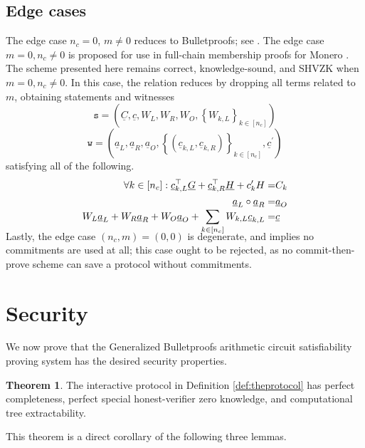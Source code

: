 \documentclass{article}
\theoremstyle{definition}
\newtheorem{theorem}{Theorem}
\begin{document}
\subsection{Edge cases}

The edge case $n_c = 0$, $m \neq 0$ reduces to Bulletproofs; see \cite{bp}.  The edge case $m = 0, n_c \neq 0$ is proposed for use in full-chain membership proofs for Monero \cite{fcmp}. 
The scheme presented here remains correct, knowledge-sound, and SHVZK when $m=0, n_c \neq 0$. In this case, the relation reduces by dropping all terms related to $m$, obtaining statements and witnesses
\[\texttt{s} = \left(\underline{C}, \underline{c}, W_L, W_R, W_O, \left\{W_{k,L}\right\}_{k \in [n_c]}\right)\] 
\[\texttt{w} = \left(\underline{a}_L, \underline{a}_R, \underline{a}_O, \left\{ (\underline{c}_{k,L}, \underline{c}_{k,R}) \right\}_{k \in [n_c]}, \underline{c}^\prime\right)\]
satisfying all of the following.
\begin{align*}
\forall k \in [n_c]: \underline{c}_{k,L}^\top \underline{G} + \underline{c}_{k,R}^\top \underline{H} + c'_k H =& C_k\\
\underline{a}_L \circ \underline{a}_R =& \underline{a}_O\\
W_L \underline{a}_L + W_R \underline{a}_R + W_O \underline{a}_O + \smash{\sum_{k \in [n_c]} W_{k,L} \underline{c}_{k,L}} =& \underline{c}
\end{align*}
Lastly, the edge case $(n_c, m) = (0,0)$ is degenerate, and implies no commitments are used at all; this case ought to be rejected, as no commit-then-prove scheme can save a protocol without commitments.

\section{Security}


We now prove that the Generalized Bulletproofs arithmetic circuit satisfiability proving system has the desired security properties.



\begin{theorem}
	The interactive protocol in Definition \ref{def:theprotocol}  has perfect completeness, perfect special honest-verifier zero knowledge,  and computational tree extractability.
\end{theorem}

This theorem is a direct corollary of the following three lemmas.
\end{document}
